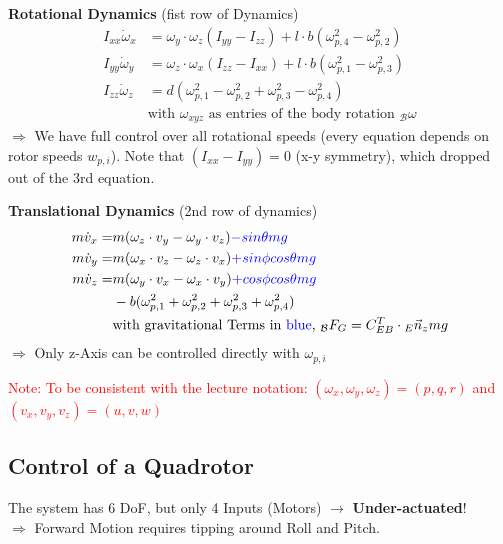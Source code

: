 \documentclass[fontsize=6pt,DIV=calc,a4paper,ngerman]{scrartcl}
\begin{document}
\begin{multicols*}{4}
	\medskip
	\textbf{Rotational Dynamics} (fist row of Dynamics)
	\begin{align*}
		I_{xx}\dot{\omega}_x & = \omega_y\cdot \omega_z (I_{yy}-I_{zz})+l\cdot b (\omega_{p,4}^2-\omega_{p,2}^2) \\
		I_{yy}\dot{\omega}_y & = \omega_z\cdot \omega_x (I_{zz}-I_{xx})+l\cdot b (\omega_{p,1}^2-\omega_{p,3}^2) \\
		I_{zz}\dot{\omega}_z & = d(\omega_{p,1}^2-\omega_{p,2}^2+\omega_{p,3}^2-\omega_{p,4}^2)                  \\
		                     & \text{with $\omega_{xyz}$ as entries of the body rotation ${}_\mathcal{B}\omega$}
	\end{align*}
	$\Rightarrow$ We have full control over all rotational speeds (every equation depends on rotor speeds $w_{p,i}$). Note that $(I_{xx}-I_{yy})=0$ (x-y symmetry), which dropped out of the 3rd equation.

	\medskip
	\textbf{Translational Dynamics} (2nd row of dynamics)
	\begin{align*}
		m\dot{v}_x = & m(\omega_z\cdot v_y - \omega_y\cdot v_z)\textcolor{blue}{-sin\theta mg}                                     \\
		m\dot{v}_y = & m(\omega_x\cdot v_z - \omega_z\cdot v_x)\textcolor{blue}{+sin\phi cos\theta mg}                             \\
		m\dot{v}_z = & m(\omega_y\cdot v_x - \omega_x\cdot v_y) \textcolor{blue}{+cos\phi cos\theta mg }                           \\
		             & - b(\omega_{p,1}^2+\omega_{p,2}^2+\omega_{p,3}^2+\omega_{p,4}^2)                                            \\
		             & \text{with gravitational Terms in \textcolor{blue}{blue}, } {}_\mathcal{B}F_G=C_{EB}^T\cdot {}_E\vec{n}_zmg
	\end{align*}
	$\Rightarrow$ Only z-Axis can be controlled directly with $\omega_{p,i}$

	\smallskip
	\textcolor{red}{Note: To be consistent with the lecture notation: $(\omega_x, \omega_y, \omega_z) = (p,q,r) $ and $(v_x, v_y, v_z) = (u, v, w)$}

	\subsection{Control of a Quadrotor}

	The system has 6 DoF, but only 4 Inputs (Motors) $\rightarrow$ \textbf{Under-actuated}! \\
	$\Rightarrow$ Forward Motion requires tipping around Roll and Pitch.


\end{multicols*}
\end{document}

